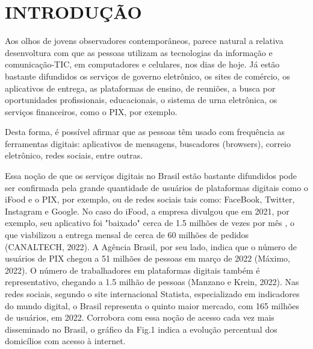 
\chapter[INTRODUÇÃO]{INTRODUÇÃO}\label{INTRODUÇÃO}
Aos olhos de jovens observadores contemporâneos, parece natural a relativa desenvoltura com que as pessoas utilizam as tecnologias da informação e comunicação-TIC, em computadores e celulares, nos dias de hoje. Já estão bastante difundidos os serviços de governo eletrônico, os sites de comércio, os aplicativos de entrega, as plataformas de ensino, de reuniões, a busca por oportunidades profissionais, educacionais, o sistema de urna eletrônica, os serviços financeiros, como o PIX, por exemplo.

Desta forma, é possível afirmar que as pessoas têm usado com frequência  as ferramentas digitais: aplicativos de mensagens, buscadores (browsers), correio eletrônico, redes sociais, entre outras.

Essa noção de que os serviços digitais no Brasil estão bastante difundidos pode ser confirmada pela grande quantidade de usuários de plataformas digitais como o iFood e o PIX, por exemplo, ou de redes sociais tais como: FaceBook, Twitter, Instagram e Google. No caso do iFood, a empresa divulgou que em 2021, por exemplo, seu aplicativo foi "baixado" cerca de 1.5 milhões de vezes por mês , o que viabilizou a entrega mensal de cerca de 60 milhões de pedidos  (CANALTECH, 2022). A Agência Brasil, por seu lado, indica que o número de usuários de PIX chegou a 51 milhões de pessoas em março de 2022 (Máximo, 2022). O número de trabalhadores em plataformas digitais também é representativo, chegando a 1.5 milhão de pessoas  (Manzano e Krein, 2022). Nas redes sociais, segundo o site internacional Statista, especializado em indicadores do mundo digital, o Brasil representa o quinto maior mercado, com 165 milhões de usuários, em 2022. Corrobora com essa noção de acesso cada vez mais disseminado no Brasil, o gráfico da Fig.1 indica a evolução percentual dos domicílios com acesso à internet.



